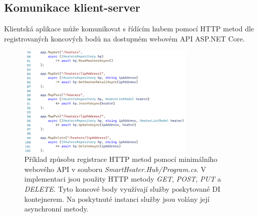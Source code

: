 \pagebreak

\subsection{Komunikace klient-server}
Klientská aplikace může komunikovat s řídícím hubem pomocí HTTP metod dle registrovaných koncových bodů na dostupném webovém API ASP.NET Core.

\begin{figure}[hbt]
\includegraphics[width=0.75\textwidth]{obrazky-figures/code-endpoints.png}
\caption{Příklad způsobu registrace HTTP metod pomocí minimálního webového API v souboru {\it SmartHeater.Hub/Program.cs}. V implementaci jsou použity HTTP metody {\it GET}, {\it POST}, {\it PUT} a {\it DELETE}. Tyto koncové body využívají služby poskytované DI kontejnerem. Na poskytnuté instanci služby jsou volány její asynchronní metody.}
\end{figure}


